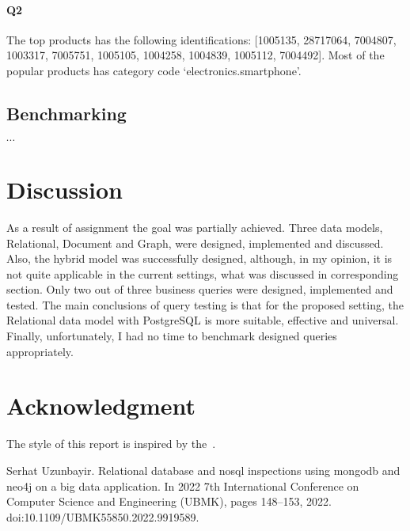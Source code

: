\documentclass[conference]{IEEEtran}
\begin{document}
\paragraph{Q2} The top products has the following identifications: [1005135,
28717064,
7004807,
1003317,
7005751,
1005105,
1004258,
1004839,
1005112,
7004492]. Most of the popular products has category code `electronics.smartphone'.

\subsection{Benchmarking}

$\cdots$


\section{Discussion}
As a result of assignment the goal was partially achieved. Three data models, Relational, Document and Graph, were designed, implemented and discussed. Also, the hybrid model was successfully designed, although, in my opinion, it is not quite applicable in the current settings, what was discussed in corresponding section. Only two out of three business queries were designed, implemented and tested. The main conclusions of query testing is that for the proposed setting, the Relational data model with PostgreSQL is more suitable, effective and universal. Finally, unfortunately, I had no time to benchmark designed queries appropriately.


\section*{Acknowledgment}

The style of this report is inspired by the~\cite{uzunbayir}.


\begin{thebibliography}{00}
     Serhat Uzunbayir. Relational database and nosql inspections using mongodb and neo4j on a big data application.
    In 2022 7th International Conference on Computer Science and Engineering (UBMK), pages 148--153, 2022.
    doi:10.1109/UBMK55850.2022.9919589.
\end{thebibliography}
\end{document}
